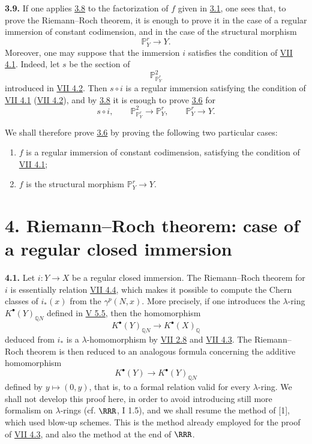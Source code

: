 \textbf{3.9.} If one applies \hyperlink{sga6.e08.lem.3-8}{3.8} to the factorization of \(f\) given in \hyperlink{sga6.e08.para.3-1}{3.1}, one sees that, to prove the Riemann--Roch theorem, it is enough to prove it in the case of a regular immersion of constant codimension, and in the case of the structural morphism
\[
 \mathbb P^r_Y\longrightarrow Y .
\]
Moreover, one may suppose that the immersion \(i\) satisfies the condition of \hyperlink{sga6.e07.lem.4-1}{VII 4.1}. Indeed, let \(s\) be the section of
\[
 \mathbb P^2_{\mathbb P^r_Y}
\]
introduced in \hyperlink{sga6.e07.sec.4.2}{VII 4.2}. Then \(s\circ i\) is a regular immersion satisfying the condition of \hyperlink{sga6.e07.lem.4-1}{VII 4.1} (\hyperlink{sga6.e07.sec.4.2}{VII 4.2}), and by \hyperlink{sga6.e08.lem.3-8}{3.8} it is enough to prove \hyperlink{sga6.e08.thm.3-6}{3.6} for
\[
s\circ i,\qquad
\mathbb P^2_{\mathbb P^r_Y}\longrightarrow\mathbb P^r_Y,\qquad
\mathbb P^r_Y\longrightarrow Y .
\]

We shall therefore prove \hyperlink{sga6.e08.thm.3-6}{3.6} by proving the following two particular cases:
\begin{enumerate}[label=\roman*)]
\item \(f\) is a regular immersion of constant codimension, satisfying the condition of \hyperlink{sga6.e07.lem.4-1}{VII 4.1};
\item \(f\) is the structural morphism \(\mathbb P^r_Y\to Y\).
\end{enumerate}

\section*{4. Riemann--Roch theorem: case of a regular closed immersion}

\textbf{4.1.} Let \(i:Y\to X\) be a regular closed immersion. The Riemann--Roch theorem for \(i\) is essentially relation \hyperlink{sga6.e07.cor.4-4}{VII 4.4}, which makes it possible to compute the Chern classes of \(i_*(x)\) from the \(\gamma^p(N,x)\). More precisely, if one introduces the \(\lambda\)-ring \(K^{\bullet}(Y)_{\mathbb Q N}\) defined in \hyperlink{sga6.e05.para.5-5}{V 5.5}, then the homomorphism
\[
K^{\bullet}(Y)_{\mathbb Q N}\longrightarrow K^{\bullet}(X)_{\mathbb Q}
\]
deduced from \(i_*\) is a \(\lambda\)-homomorphism by \hyperlink{sga6.e07.cor.2-8}{VII 2.8} and \hyperlink{sga6.e07.thm.4-3}{VII 4.3}. The Riemann--Roch theorem is then reduced to an analogous formula concerning the additive homomorphism
\[
K^{\bullet}(Y)\longrightarrow K^{\bullet}(Y)_{\mathbb Q N}
\]
defined by \(y\mapsto(0,y)\), that is, to a formal relation valid for every \(\lambda\)-ring. We shall not develop this proof here, in order to avoid introducing still more formalism on \(\lambda\)-rings (cf. \(\RRR\), I 1.5), and we shall resume the method of [1], which used blow-up schemes. This is the method already employed for the proof of \hyperlink{sga6.e07.thm.4-3}{VII 4.3}, and also the method at the end of \(\RRR\).

